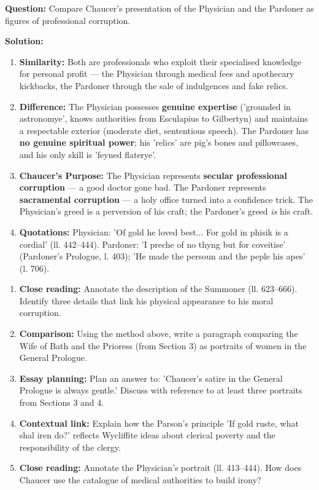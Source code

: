 \documentclass[11pt]{article}
\newcounter{popsec}
\newcounter{popsub}
\newcommand{\courssub}[1]{%
  \stepcounter{popsub}%
  \par\vspace{9pt}\noindent{\popxbold\fontsize{11.5}{13}\selectfont\color{popink}{\color{poporange}\thepopsec.\thepopsub}\hspace{6pt}#1}\par\nopagebreak\vspace{4pt}
}
\begin{document}
\begin{exoresolu}
\textbf{Question:} Compare Chaucer's presentation of the Physician and the Pardoner as figures of professional corruption.

\textbf{Solution:}
\begin{enumerate}
\item \textbf{Similarity:} Both are professionals who exploit their specialised knowledge for personal profit — the Physician through medical fees and apothecary kickbacks, the Pardoner through the sale of indulgences and fake relics.
\item \textbf{Difference:} The Physician possesses \textbf{genuine expertise} ('grounded in astronomye', knows authorities from Esculapius to Gilbertyn) and maintains a respectable exterior (moderate diet, sententious speech). The Pardoner has \textbf{no genuine spiritual power}; his 'relics' are pig's bones and pillowcases, and his only skill is 'feyned flaterye'.
\item \textbf{Chaucer's Purpose:} The Physician represents \textbf{secular professional corruption} — a good doctor gone bad. The Pardoner represents \textbf{sacramental corruption} — a holy office turned into a confidence trick. The Physician's greed is a perversion of his craft; the Pardoner's greed \emph{is} his craft.
\item \textbf{Quotations:} Physician: 'Of gold he loved best... For gold in phisik is a cordial' (ll. 442–444). Pardoner: 'I preche of no thyng but for coveitise' (Pardoner's Prologue, l. 403); 'He made the persoun and the peple his apes' (l. 706).
\end{enumerate}
\end{exoresolu}

\courssub{Consolidation Exercises}

\begin{exercice}
\begin{enumerate}
\item \textbf{Close reading:} Annotate the description of the Summoner (ll. 623–666). Identify three details that link his physical appearance to his moral corruption.
\item \textbf{Comparison:} Using the method above, write a paragraph comparing the Wife of Bath and the Prioress (from Section 3) as portraits of women in the General Prologue.
\item \textbf{Essay planning:} Plan an answer to: 'Chaucer's satire in the General Prologue is always gentle.' Discuss with reference to at least three portraits from Sections 3 and 4.
\item \textbf{Contextual link:} Explain how the Parson's principle 'If gold ruste, what shal iren do?' reflects Wycliffite ideas about clerical poverty and the responsibility of the clergy.
\item \textbf{Close reading:} Annotate the Physician's portrait (ll. 413–444). How does Chaucer use the catalogue of medical authorities to build irony?
\end{enumerate}
\end{exercice}
\end{document}
